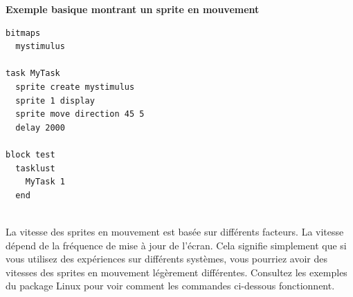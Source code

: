 \documentclass[
]{book}
\begin{document}
\textbf{Exemple basique montrant un sprite en mouvement}

\begin{verbatim}
bitmaps
  mystimulus

task MyTask
  sprite create mystimulus
  sprite 1 display
  sprite move direction 45 5
  delay 2000

block test
  tasklust
    MyTask 1
  end
  
\end{verbatim}

La vitesse des sprites en mouvement est basée sur différents facteurs. La vitesse dépend de la fréquence de mise à jour de l'écran. Cela signifie simplement que si vous utilisez des expériences sur différents systèmes, vous pourriez avoir des vitesses des sprites en mouvement légèrement différentes. Consultez les exemples du package Linux pour voir comment les commandes ci-dessous fonctionnent.
\end{document}
